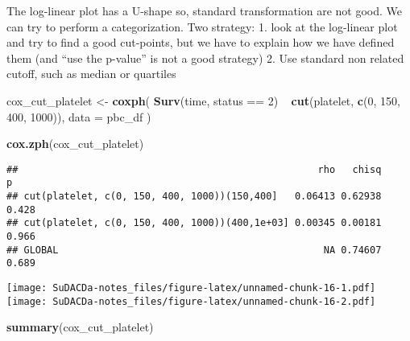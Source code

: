 \documentclass[]{book}
\newenvironment{Shaded}{\begin{snugshade}}{\end{snugshade}}
\newcommand{\KeywordTok}[1]{\textcolor[rgb]{0.13,0.29,0.53}{\textbf{{#1}}}}
\newcommand{\DataTypeTok}[1]{\textcolor[rgb]{0.13,0.29,0.53}{{#1}}}
\newcommand{\DecValTok}[1]{\textcolor[rgb]{0.00,0.00,0.81}{{#1}}}
\newcommand{\StringTok}[1]{\textcolor[rgb]{0.31,0.60,0.02}{{#1}}}
\newcommand{\NormalTok}[1]{{#1}}
\theoremstyle{definition}
\theoremstyle{definition}
\theoremstyle{definition}
\theoremstyle{remark}
\begin{document}
The log-linear plot has a U-shape so, standard transformation are not
good. We can try to perform a categorization. Two strategy: 1. look at
the log-linear plot and try to find a good cut-points, but we have to
explain how we have defined them (and ``use the p-value'' is not a good
strategy) 2. Use standard non related cutoff, such as median or
quartiles

\begin{Shaded}
\begin{Highlighting}[]
\NormalTok{cox_cut_platelet <-}\StringTok{ }\KeywordTok{coxph}\NormalTok{(}
  \KeywordTok{Surv}\NormalTok{(time, status ==}\StringTok{ }\DecValTok{2}\NormalTok{) ~}\StringTok{ }\KeywordTok{cut}\NormalTok{(platelet, }\KeywordTok{c}\NormalTok{(}\DecValTok{0}\NormalTok{, }\DecValTok{150}\NormalTok{, }\DecValTok{400}\NormalTok{, }\DecValTok{1000}\NormalTok{)),}
  \DataTypeTok{data =} \NormalTok{pbc_df}
\NormalTok{)}

\KeywordTok{cox.zph}\NormalTok{(cox_cut_platelet)}
\end{Highlighting}
\end{Shaded}

\begin{verbatim}
##                                                    rho   chisq     p
## cut(platelet, c(0, 150, 400, 1000))(150,400]   0.06413 0.62938 0.428
## cut(platelet, c(0, 150, 400, 1000))(400,1e+03] 0.00345 0.00181 0.966
## GLOBAL                                              NA 0.74607 0.689
\end{verbatim}

\begin{Shaded}
\end{Shaded}

\texttt{[image: SuDACDa-notes\_files/figure-latex/unnamed-chunk-16-1.pdf]}
\texttt{[image: SuDACDa-notes\_files/figure-latex/unnamed-chunk-16-2.pdf]}

\begin{Shaded}
\begin{Highlighting}[]
\KeywordTok{summary}\NormalTok{(cox_cut_platelet)}
\end{Highlighting}
\end{Shaded}
\end{document}
